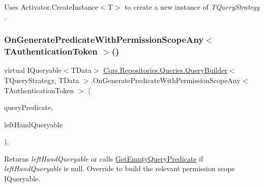 Uses Activator.\+Create\+Instance$<$\+T$>$ to create a new instance of {\itshape T\+Query\+Strategy} . 

\mbox{\label{classCqrs_1_1Repositories_1_1Queries_1_1QueryBuilder_aee213115d002518b78463c7bc5fb5c52_aee213115d002518b78463c7bc5fb5c52}} 
\subsubsection{\texorpdfstring{On\+Generate\+Predicate\+With\+Permission\+Scope\+Any$<$ T\+Authentication\+Token $>$()}{OnGeneratePredicateWithPermissionScopeAny< TAuthenticationToken >()}}
{\footnotesize\ttfamily virtual I\+Queryable$<$T\+Data$>$ \hyperlink{classCqrs_1_1Repositories_1_1Queries_1_1QueryBuilder}{Cqrs.\+Repositories.\+Queries.\+Query\+Builder}$<$ T\+Query\+Strategy, T\+Data $>$.On\+Generate\+Predicate\+With\+Permission\+Scope\+Any$<$ T\+Authentication\+Token $>$ (\begin{DoxyParamCaption}\item[{\hyperlink{classCqrs_1_1Repositories_1_1Queries_1_1QueryPredicate}{Query\+Predicate}}]{query\+Predicate,  }\item[{I\+Queryable$<$ T\+Data $>$}]{left\+Hand\+Queryable }\end{DoxyParamCaption})\hspace{0.3cm}{\ttfamily [protected]}, {\ttfamily [virtual]}}



Returns {\itshape left\+Hand\+Queryable}  or calls \hyperlink{classCqrs_1_1Repositories_1_1Queries_1_1QueryBuilder_a7dc8f0da3bb4ef54b8cbdda6c50ee0a1_a7dc8f0da3bb4ef54b8cbdda6c50ee0a1}{Get\+Empty\+Query\+Predicate} if {\itshape left\+Hand\+Queryable}  is null. Override to build the relevant permission scope I\+Queryable. 

